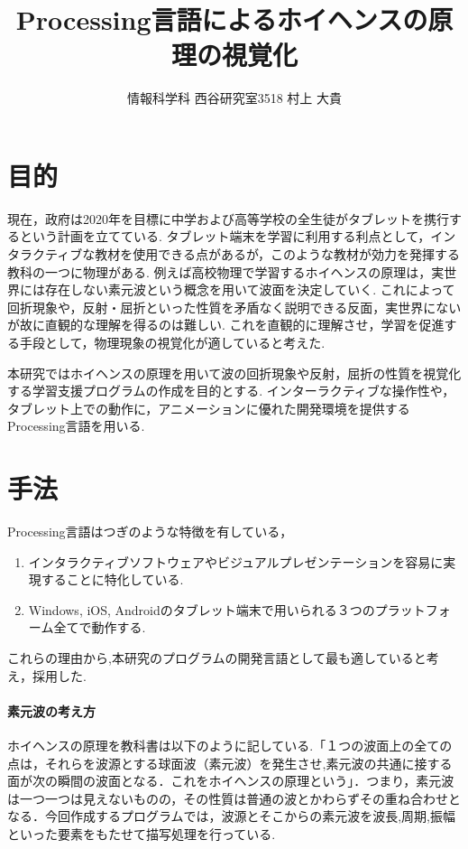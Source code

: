 \documentclass[a4j,twocolumn,uplatex]{jarticle}
\begin{document}
\title{Processing言語によるホイヘンスの原理の視覚化}
\author{情報科学科 西谷研究室3518 村上 大貴}
\date{}
\maketitle
\section{目的}
\vspace{-0.5em}
現在，政府は2020年を目標に中学および高等学校の全生徒がタブレットを携行するという計画を立てている\cite{tablet}.
タブレット端末を学習に利用する利点として，インタラクティブな教材を使用できる点があるが，このような教材が効力を発揮する教科の一つに物理がある.
例えば高校物理で学習するホイヘンスの原理は，実世界には存在しない素元波という概念を用いて波面を決定していく. これによって回折現象や，反射・屈折といった性質を矛盾なく説明できる反面，実世界にないが故に直観的な理解を得るのは難しい.
これを直観的に理解させ，学習を促進する手段として，物理現象の視覚化が適していると考えた.

本研究ではホイヘンスの原理を用いて波の回折現象や反射，屈折の性質を視覚化する学習支援プログラムの作成を目的とする.
インターラクティブな操作性や，タブレット上での動作に，アニメーションに優れた開発環境を提供するProcessing言語を用いる. 

\vspace{-2em}
\section{手法}
\vspace{-0.5em}
Processing言語はつぎのような特徴を有している\cite{ishikawa}，
\begin{enumerate}
\item インタラクティブソフトウェアやビジュアルプレゼンテーションを容易に実現することに特化している.
\item Windows, iOS, Androidのタブレット端末で用いられる３つのプラットフォーム全てで動作する. 
\end{enumerate}
これらの理由から,本研究のプログラムの開発言語として最も適していると考え，採用した.

\vspace{-1em}
\paragraph{素元波の考え方}
ホイヘンスの原理を教科書は以下のように記している.「１つの波面上の全ての点は，それらを波源とする球面波（素元波）を発生させ,素元波の共通に接する面が次の瞬間の波面となる．これをホイヘンスの原理という」\cite[p.195]{kyoukasyo}．つまり，素元波は一つ一つは見えないものの，その性質は普通の波とかわらずその重ね合わせとなる．今回作成するプログラムでは，波源とそこからの素元波を波長,周期,振幅といった要素をもたせて描写処理を行っている.
\end{document}
